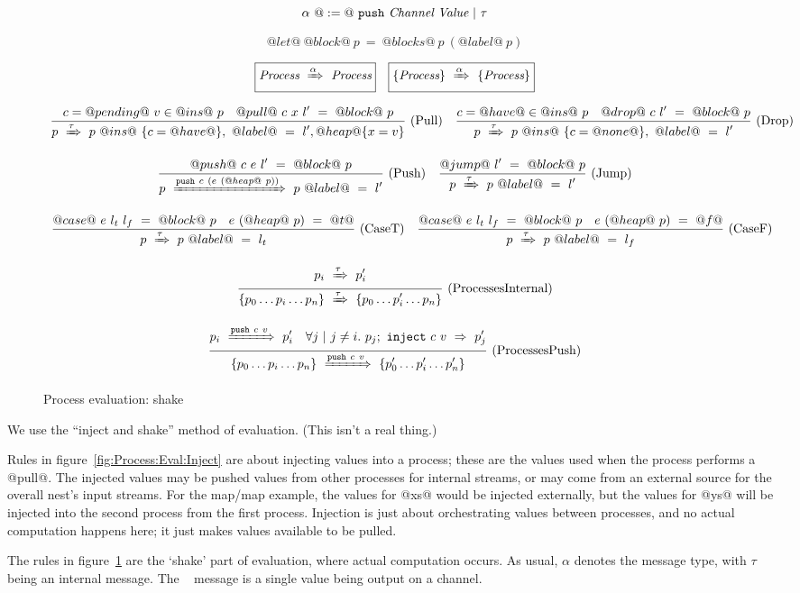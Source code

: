 \begin{figure}

$$
\alpha~@:=@~ \texttt{push}~\textit{Channel}~\textit{Value} ~|~ \tau
$$

$$
@let@~@block@~p~=~@blocks@~p~(@label@~p)
$$

$$
\begin{array}{lr} 
  \boxed{\textit{Process}~\xRightarrow{\alpha}~\textit{Process}}
 & 
  \boxed{\{ \textit{Process} \}~\xRightarrow{\alpha}~\{ \textit{Process} \}}
 \end{array}
$$



$$
\enskip \frac {\displaystyle 
  c=@pending@~v \in @ins@~p
  \quad
  @pull@~c~x~l'~=~@block@~p
} {\displaystyle 
  p~\xRightarrow{\tau}~p ~@ins@~ \{ c = @have@\},~@label@~=~l', @heap@ \{ x = v\}
} \  \mbox{(Pull)} \enskip
\enskip \frac {\displaystyle 
  c=@have@ \in @ins@~p
  \quad
  @drop@~c~l'~=~@block@~p
} {\displaystyle 
  p~\xRightarrow{\tau}~p ~@ins@~ \{ c = @none@\},~@label@~=~l'
} \  \mbox{(Drop)} \enskip
$$

$$
\enskip \frac {\displaystyle 
  @push@~c~e~l'~=~@block@~p
} {\displaystyle 
  p~\xRightarrow{\texttt{push}~c~(e~(@heap@~p))}~p~@label@~=~l'
} \  \mbox{(Push)} \enskip
\enskip \frac {\displaystyle 
  @jump@~l'~=~@block@~p
} {\displaystyle 
  p~\xRightarrow{\tau}~p~@label@~=~l'
} \  \mbox{(Jump)} \enskip
$$

$$
\enskip \frac {\displaystyle 
  @case@~e~l_t~l_f~=~@block@~p
  \quad
  e~(@heap@~p)~=~@t@
} {\displaystyle 
  p~\xRightarrow{\tau}~p~@label@~=~l_t
} \  \mbox{(CaseT)} \enskip
\enskip \frac {\displaystyle 
  @case@~e~l_t~l_f~=~@block@~p
  \quad
  e~(@heap@~p)~=~@f@
} {\displaystyle 
  p~\xRightarrow{\tau}~p~@label@~=~l_f
} \  \mbox{(CaseF)} \enskip
$$



$$
\ruleIN{
  \ProcShake{p_i}{\tau}{p'_i}
}{
  \ProcsShake{
    \sgl{p_0 \ldots p_i \ldots p_n}
  }{\tau}{
    \sgl{p_0 \ldots p'_i \ldots p_n}
  }
}{ProcessesInternal}
$$

$$
\ruleIN{
  \ProcShake{p_i}{\Push~c~v}{p'_i}
  \quad
  \forall j~|~j \neq i.~
  \ProcInject{p_j}{c}{v}{p'_j}
}{
  \ProcsShake{
    \sgl{p_0 \ldots p_i \ldots p_n}
  }{\Push~c~v}{
    \sgl{p'_0 \ldots p'_i \ldots p'_n}
  }
}{ProcessesPush}
$$


\caption{Process evaluation: shake}
\label{fig:Process:Eval:Shake}
\end{figure}

We use the ``inject and shake'' method of evaluation. (This isn't a real thing.)

Rules in figure~\ref{fig:Process:Eval:Inject} are about injecting values into a process; these are the values used when the process performs a @pull@.
The injected values may be pushed values from other processes for internal streams, or may come from an external source for the overall nest's input streams.
For the map/map example, the values for @xs@ would be injected externally, but the values for @ys@ will be injected into the second process from the first process.
Injection is just about orchestrating values between processes, and no actual computation happens here; it just makes values available to be pulled.

The rules in figure~\ref{fig:Process:Eval:Shake} are the `shake' part of evaluation, where actual computation occurs. 
As usual, $\alpha$ denotes the message type, with $\tau$ being an internal message. The \Push~ message is a single value being output on a channel.
